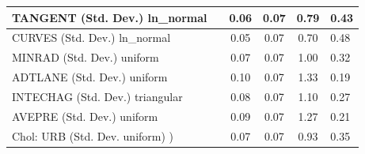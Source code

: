 \begin{table}
\begin{center}
\begin{tabular}{|l|l|c|c|c|l|}
			\hline
			TANGENT (Std. Dev.) ln_normal &  & 0.06 & 0.07 & 0.79 & 0.43 \\
			\hline
			CURVES (Std. Dev.) ln_normal &  & 0.05 & 0.07 & 0.70 & 0.48 \\
			\hline
			MINRAD (Std. Dev.) uniform &  & 0.07 & 0.07 & 1.00 & 0.32 \\
			\hline
			ADTLANE (Std. Dev.) uniform &  & 0.10 & 0.07 & 1.33 & 0.19 \\
			\hline
			INTECHAG (Std. Dev.) triangular &  & 0.08 & 0.07 & 1.10 & 0.27 \\
			\hline
			AVEPRE (Std. Dev.) uniform &  & 0.09 & 0.07 & 1.27 & 0.21 \\
			\hline
			 Chol: URB (Std. Dev. uniform) ) &  & 0.07 & 0.07 & 0.93 & 0.35 \\
			\hline
		\end{tabular}
	\end{center}
\end{table}